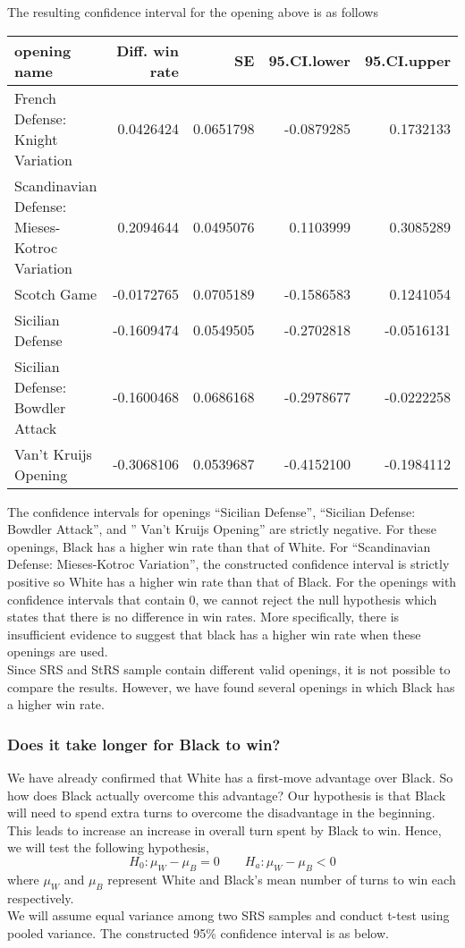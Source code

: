 \documentclass[11pt,]{article}
\begin{document}
The resulting confidence interval for the opening above is as follows

\begin{tabular}{l|r|r|r|r}
\hline
opening name & Diff. win rate & SE & 95.CI.lower & 95.CI.upper\\
\hline
French Defense: Knight Variation & 0.0426424 & 0.0651798 & -0.0879285 & 0.1732133\\
\hline
Scandinavian Defense: Mieses-Kotroc Variation & 0.2094644 & 0.0495076 & 0.1103999 & 0.3085289\\
\hline
Scotch Game & -0.0172765 & 0.0705189 & -0.1586583 & 0.1241054\\
\hline
Sicilian Defense & -0.1609474 & 0.0549505 & -0.2702818 & -0.0516131\\
\hline
Sicilian Defense: Bowdler Attack & -0.1600468 & 0.0686168 & -0.2978677 & -0.0222258\\
\hline
Van't Kruijs Opening & -0.3068106 & 0.0539687 & -0.4152100 & -0.1984112\\
\hline
\end{tabular}

The confidence intervals for openings ``Sicilian Defense'', ``Sicilian
Defense: Bowdler Attack'', and '' Van't Kruijs Opening'' are strictly
negative. For these openings, Black has a higher win rate than that of
White. For ``Scandinavian Defense: Mieses-Kotroc Variation'', the
constructed confidence interval is strictly positive so White has a
higher win rate than that of Black. For the openings with confidence
intervals that contain 0, we cannot reject the null hypothesis which
states that there is no difference in win rates. More specifically,
there is insufficient evidence to suggest that black has a higher win
rate when these openings are used.\\
\newline Since SRS and StRS sample contain different valid openings, it
is not possible to compare the results. However, we have found several
openings in which Black has a higher win rate.

\hypertarget{does-it-take-longer-for-black-to-win}{%
\subsubsection{Does it take longer for Black to
win?}\label{does-it-take-longer-for-black-to-win}}

We have already confirmed that White has a first-move advantage over
Black. So how does Black actually overcome this advantage? Our
hypothesis is that Black will need to spend extra turns to overcome the
disadvantage in the beginning. This leads to increase an increase in
overall turn spent by Black to win. Hence, we will test the following
hypothesis,
\[H_0 : \mu_W - \mu_B = 0 \quad \quad H_a: \mu_W - \mu_B < 0\] where
\(\mu_W\) and \(\mu_B\) represent White and Black's mean number of turns
to win each respectively.\\
\newline We will assume equal variance among two SRS samples and conduct
t-test using pooled variance. The constructed 95\% confidence interval
is as below.
\end{document}
